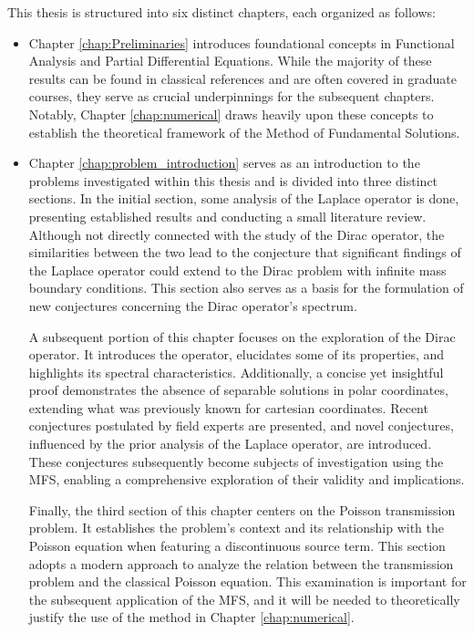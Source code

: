 This thesis is structured into six distinct chapters, each organized as follows:
\begin{itemize}
\item Chapter \ref{chap:Preliminaries} introduces foundational concepts in Functional Analysis and Partial Differential Equations. While the majority of these results can be found in classical references and are often covered in graduate courses, they serve as crucial underpinnings for the subsequent chapters. Notably, Chapter \ref{chap:numerical} draws heavily upon these concepts to establish the theoretical framework of the Method of Fundamental Solutions. 

\item Chapter \ref{chap:problem_introduction} serves as an introduction to the problems investigated within this thesis and is divided into three distinct sections. In the initial section, some analysis of the Laplace operator is done, presenting established results and conducting a small literature review. Although not directly connected with the study of the Dirac operator, the similarities between the two lead to the conjecture that significant findings of the Laplace operator could extend to the Dirac problem with infinite mass boundary conditions. This section also serves as a basis for the formulation of new conjectures concerning the Dirac operator's spectrum.

A subsequent portion of this chapter focuses on the exploration of the Dirac operator. It introduces the operator, elucidates some of its properties, and highlights its spectral characteristics. Additionally, a concise yet insightful proof demonstrates the absence of separable solutions in polar coordinates, extending what was previously known for cartesian coordinates. Recent conjectures postulated by field experts are presented, and novel conjectures, influenced by the prior analysis of the Laplace operator, are introduced. These conjectures subsequently become subjects of investigation using the \ac{MFS}, enabling a comprehensive exploration of their validity and implications.

Finally, the third section of this chapter centers on the Poisson transmission problem. It establishes the problem's context and its relationship with the Poisson equation when featuring a discontinuous source term. This section adopts a modern approach to analyze the relation between the transmission problem and the classical Poisson equation. This examination is important for the subsequent application of the \ac{MFS}, and it will be needed to theoretically justify the use of the method in Chapter \ref{chap:numerical}.


\end{itemize}
